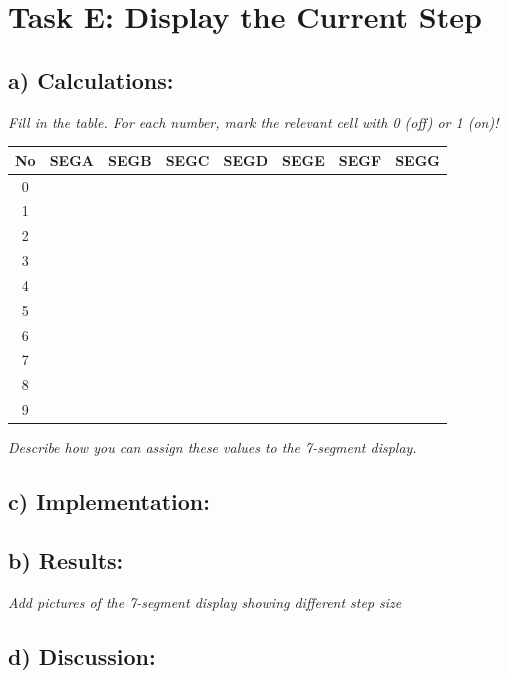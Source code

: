 \section{Task E: Display the Current Step}

\subsection{a) Calculations:}
\textit{Fill in the table. For each number, mark the relevant cell with 0 (off) or 1 (on)!}

\begin{table}[h]
    \centering\small
    \begin{tabularx}{\textwidth}{|c|*{7}{>{\centering\arraybackslash}X|}}
        \hline
        \textbf{No} & \textbf{SEGA} & \textbf{SEGB} & \textbf{SEGC} & \textbf{SEGD} & \textbf{SEGE} & \textbf{SEGF} & \textbf{SEGG} \\ \hline
        0 & & & & & & & \\ \hline
        1 & & & & & & & \\ \hline
        2 & & & & & & & \\ \hline
        3 & & & & & & & \\ \hline
        4 & & & & & & & \\ \hline
        5 & & & & & & & \\ \hline
        6 & & & & & & & \\ \hline
        7 & & & & & & & \\ \hline
        8 & & & & & & & \\ \hline
        9 & & & & & & & \\ \hline
    \end{tabularx}
\end{table}

\textit{Describe how you can assign these values to the 7-segment display.}

\subsection{c) Implementation:}
\subsection{b) Results:}
\textit{Add pictures of the 7-segment display showing different step size}

\subsection{d) Discussion:}
